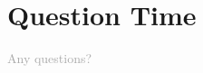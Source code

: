 \documentclass[UTF8, aspectratio = 43]{beamer}
\begin{document}
		\section{Question Time}
		\begin{frame}
			\begin{center}
				\Huge
				\textcolor{darkgray}{Any questions?}
			\end{center}
		\end{frame}
		
\end{document}
